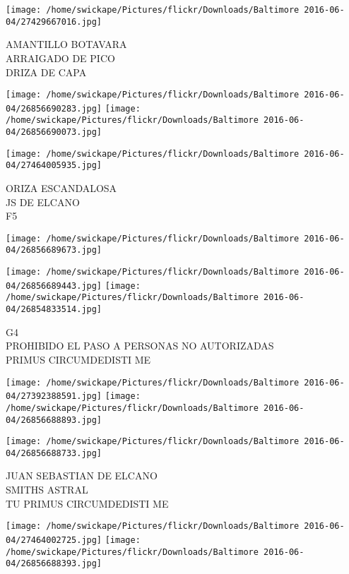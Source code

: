 \documentclass[10pt,letterpaper]{article}
\begin{document}
\vspace{0.25in}
\texttt{[image: /home/swickape/Pictures/flickr/Downloads/Baltimore 2016-06-04/27429667016.jpg]}

AMANTILLO BOTAVARA\\
ARRAIGADO DE PICO\\
DRIZA DE CAPA
\pagebreak

\texttt{[image: /home/swickape/Pictures/flickr/Downloads/Baltimore 2016-06-04/26856690283.jpg]}
\texttt{[image: /home/swickape/Pictures/flickr/Downloads/Baltimore 2016-06-04/26856690073.jpg]}

\vspace{0.25in}
\texttt{[image: /home/swickape/Pictures/flickr/Downloads/Baltimore 2016-06-04/27464005935.jpg]}

ORIZA ESCANDALOSA\\
JS DE ELCANO\\
F5
\pagebreak

\texttt{[image: /home/swickape/Pictures/flickr/Downloads/Baltimore 2016-06-04/26856689673.jpg]}

\vspace{0.25in}
\texttt{[image: /home/swickape/Pictures/flickr/Downloads/Baltimore 2016-06-04/26856689443.jpg]}
\texttt{[image: /home/swickape/Pictures/flickr/Downloads/Baltimore 2016-06-04/26854833514.jpg]}

G4\\
PROHIBIDO EL PASO A PERSONAS NO AUTORIZADAS\\
PRIMUS CIRCUMDEDISTI ME
\pagebreak

\texttt{[image: /home/swickape/Pictures/flickr/Downloads/Baltimore 2016-06-04/27392388591.jpg]}
\texttt{[image: /home/swickape/Pictures/flickr/Downloads/Baltimore 2016-06-04/26856688893.jpg]}

\vspace{0.25in}
\texttt{[image: /home/swickape/Pictures/flickr/Downloads/Baltimore 2016-06-04/26856688733.jpg]}

JUAN SEBASTIAN DE ELCANO\\
SMITHS ASTRAL\\
TU PRIMUS CIRCUMDEDISTI ME
\pagebreak

\texttt{[image: /home/swickape/Pictures/flickr/Downloads/Baltimore 2016-06-04/27464002725.jpg]}
\texttt{[image: /home/swickape/Pictures/flickr/Downloads/Baltimore 2016-06-04/26856688393.jpg]}
\end{document}
